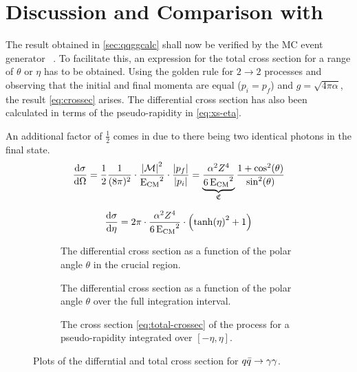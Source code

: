 \section{Discussion and Comparison with \sherpa}%
\label{sec:compsher}

The result obtained in \cref{sec:qqggcalc} shall now be verified by the
MC event generator \sherpa{}~\cite{Gleisberg:2008ta}. To
facilitate this, an expression for the total cross section for a range
of \(\theta\) or \(\eta\) has to be obtained. Using the golden rule
for \(2\rightarrow 2\) processes and observing that the initial and
final momenta are equal (\(p_i=p_f\)) and \(g=\sqrt{4\pi\alpha}\), the
result \cref{eq:crossec} arises. The differential cross section has
also been calculated in terms of the pseudo-rapidity
in \cref{eq:xs-eta}.

An additional factor of \(\frac{1}{2}\) comes in due to there being
two identical photons in the final state.
\begin{equation}
  \label{eq:crossec}
  \dv{\sigma}{\Omega} =
  \frac{1}{2}\frac{1}{(8\pi)^2}\cdot\frac{\abs{\mathcal{M}}^2}{\operatorname{E_{\text{CM}}}^2}\cdot\frac{\abs{p_f}}{\abs{p_i}}
  = \underbrace{\frac{\alpha^2Z^4}{6\operatorname{E_{\text{CM}}}^2}}_{\mathfrak{C}}\frac{1+\cos^2(\theta)}{\sin^2(\theta)}
\end{equation}

\begin{equation}
  \label{eq:xs-eta}
  \dv{\sigma}{\eta} = 2\pi\cdot\frac{\alpha^2Z^4}{6\operatorname{E_{\text{CM}}}^2}\cdot\qty(\tanh(\eta)^2 + 1)
\end{equation}

\begin{figure}[ht]
  \centering
  \begin{subfigure}[t]{.49\textwidth}
    \centering {}

    \caption[Plot of the differential cross section of the \(\qqgg\)
    process.]{\label{fig:diffxs_zoom} The differential cross section as a
      function of the polar angle \(\theta\) in the crucial region.}
  \end{subfigure}
  \begin{subfigure}[t]{.49\textwidth}
    \centering {}
    \caption[Plot of the differential cross section of the \(\qqgg\)
    process.]{\label{fig:diffxs} The differential cross section as a
      function of the polar angle \(\theta\) over the full integration
      interval. }
  \end{subfigure}
  \begin{subfigure}[t]{.49\textwidth}
  \centering
  \caption[Plot of the total cross section of the \(\qqgg\)
  process.]{\label{fig:totxs} The cross section
    \cref{eq:total-crossec} of the process for a pseudo-rapidity
    integrated over \([-\eta, \eta]\).}
\end{subfigure}
\caption{\label{fig:xsfirst} Plots of the differntial and total cross section
  for \(\qqgg\).}
\end{figure}


